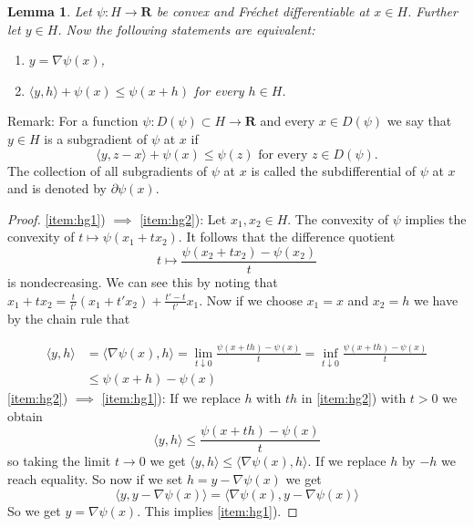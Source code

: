 \documentclass[a4paper,11pt, leqno]{scrreprt} %
\renewcommand{\leq}{\leqslant}
\renewcommand{\leq}{\leqslant}
\newcommand{\R}{\mathbf R}
\theoremstyle{change}
\newcounter{acounter}[chapter]
\newtheorem{lemma}[acounter]{Lemma}
\theoremstyle{nonumberplain}
\newtheorem{proof}{Proof}
\begin{document}
\begin{lemma} \label{lemma:hgf1}
Let $\psi: H \to \R$ be convex and Fr\'echet differentiable at $x \in H$. Further let $y \in H$. Now the following statements are equivalent:
\begin{enumerate}
  \item\label{item:hg1} $y = \nabla \psi(x)$,
  \item\label{item:hg2} $\langle y, h \rangle + \psi(x) \leq \psi(x + h)$ for every $h \in H$.
\end{enumerate}
\end{lemma}
Remark: For a function $\psi: D(\psi) \subset H \to \R$ and every $x \in D(\psi)$ we say that $y \in H$ is a subgradient of $\psi$ at $x$ if
\begin{equation}
\langle y, z - x \rangle + \psi(x) \leq \psi(z) \text{ for every $z \in D(\psi)$.}
\end{equation}
The collection of all subgradients of $\psi$ at $x$ is called the subdifferential of $\psi$ at $x$ and is denoted by $\partial \psi(x)$.

\begin{proof}
\ref{item:hg1}) $\implies$ \ref{item:hg2}): Let $x_1,x_2 \in H$. The convexity of $\psi$ implies the convexity of $t \mapsto \psi(x_1 + t x_2)$.
It follows that the difference quotient
\[
t \mapsto \frac{\psi(x_2 + t x_2) - \psi(x_2)}{t}
\]
is nondecreasing. We can see this by noting that $x_1 + t x_2 = \frac{t}{t'} (x_1 + t' x_2) + \frac{t'-t}{t'} x_1$. Now if we choose $x_1 = x$ and $x_2 = h$ we have by the chain rule that

\begin{equation}
\begin{split}
\langle y, h \rangle &= \langle \nabla \psi(x), h \rangle = \lim_{t \downarrow 0} \frac{\psi(x + t h) - \psi(x)}{t} = \inf_{t \downarrow 0} \frac{\psi(x + t h) - \psi(x)}{t}\\
& \leq \psi(x + h) - \psi(x)
\end{split}
\end{equation}
\ref{item:hg2}) $\implies$ \ref{item:hg1}): If we replace $h$ with $th$ in \ref{item:hg2}) with $t > 0$ we obtain
\[
\langle y, h \rangle \leq \frac{\psi(x + t h) - \psi(x)}{t}
\]
so taking the limit $t \to 0$ we get $\langle y, h \rangle \leq \langle \nabla \psi(x), h \rangle$. If we replace $h$ by $-h$ we reach equality. So now if we set $h = y - \nabla \psi(x)$ we get
\[
\langle y, y - \nabla \psi(x) \rangle = \langle \nabla \psi(x), y - \nabla \psi(x) \rangle
\]
So we get $y = \nabla \psi(x)$. This implies \ref{item:hg1}).
\end{proof}
\end{document}
